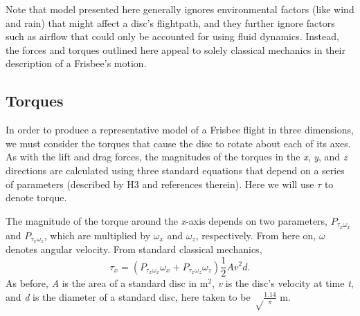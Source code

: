 \documentclass[a4paper,12pt, oneside]{article}
\newcommand{\red}[1]{\textcolor{red}{#1}}
\begin{document}
Note that model presented here generally ignores environmental factors (like wind and rain) that might affect a disc's flightpath, and they further ignore factors such as airflow that could only be accounted for using fluid dynamics. Instead, the forces and torques outlined here appeal to solely classical mechanics in their description of a Frisbee's motion.
\subsection{Torques}

In order to produce a representative model of a Frisbee flight in three dimensions, we must consider the torques that cause the disc to rotate about each of its axes. As with the lift and drag forces, the magnitudes of the torques in the \textit{x}, \textit{y}, and \textit{z} directions are calculated using three standard equations that depend on a series of parameters (described by H3 and references therein). Here we will use $\tau$ to denote torque.

The magnitude of the torque around the \textit{x}-axis depends on two parameters, $P_{\tau_x\omega_x}$ and $P_{\tau_x\omega_z}$, which are multiplied by $\omega_x$ and $\omega_z$, respectively. From here on, $\omega$ denotes angular velocity. From standard classical mechanics,
\begin{equation}
  \tau_x=(P_{\tau_x\omega_x}\omega_x+P_{\tau_x\omega_z}\omega_z)\frac{1}2Av^2d.
\end{equation}
As before, \textit{A} is the area of a standard disc in m$^2$, \textit{v} is the disc's velocity at time \textit{t}, and \textit{d} is the diameter of a standard disc, here taken to be $\sqrt\frac{1.14}\pi$ m.
\end{document}
